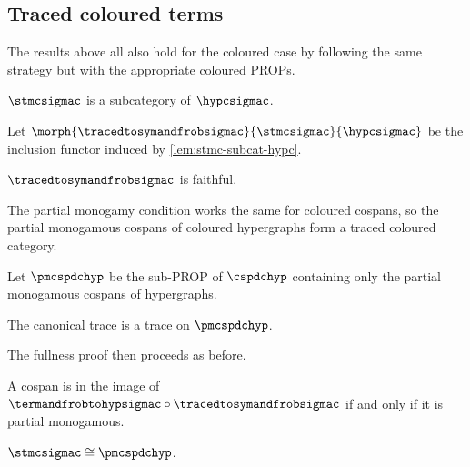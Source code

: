 \subsection{Traced coloured terms}

The results above all also hold for the coloured case by following the same
strategy but with the appropriate coloured PROPs.

\begin{lemma}\label{lem:stmc-subcat-hypc}
    \(\stmcsigmac\) is a subcategory of \(\hypcsigmac\).
\end{lemma}

\begin{definition}
    Let \(\morph{\tracedtosymandfrobsigmac}{\stmcsigmac}{\hypcsigmac}\) be the
    inclusion functor induced by \cref{lem:stmc-subcat-hypc}.
\end{definition}

\begin{corollary}
    \(\tracedtosymandfrobsigmac\) is faithful.
\end{corollary}

The partial monogamy condition works the same for coloured cospans, so
the partial monogamous cospans of coloured hypergraphs form a traced coloured
category.

\begin{definition}
    Let \(\pmcspdchyp\) be the sub-PROP of \(\cspdchyp\) containing only the
    partial monogamous cospans of hypergraphs.
\end{definition}

\begin{theorem}
    The canonical trace is a trace on \(\pmcspdchyp\).
\end{theorem}

The fullness proof then proceeds as before.

\begin{theorem}
    A cospan is in the image of
    \(\termandfrobtohypsigmac \circ \tracedtosymandfrobsigmac\) if and only if
    it is partial monogamous.
\end{theorem}

\begin{corollary}
    \(\stmcsigmac \cong \pmcspdchyp\).
\end{corollary}